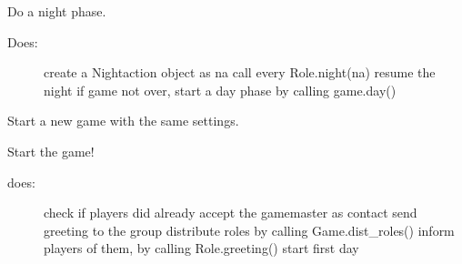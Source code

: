 \documentclass[letterpaper,10pt,english]{sphinxmanual}
\begin{document}
\begin{fulllineitems}
\begin{fulllineitems}
\label{\detokenize{chatwolf:chatwolf.game.Game.night}}
Do a night phase.
\begin{description}
\item[{Does:}] \leavevmode
create a Nightaction object as na
call every Role.night(na)
resume the night
if game not over, start a day phase by calling game.day()

\end{description}

\end{fulllineitems}


\begin{fulllineitems}
\label{\detokenize{chatwolf:chatwolf.game.Game.restart}}
Start a new game with the same settings.

\end{fulllineitems}


\begin{fulllineitems}
\label{\detokenize{chatwolf:chatwolf.game.Game.save_config}}
\end{fulllineitems}


\begin{fulllineitems}
\label{\detokenize{chatwolf:chatwolf.game.Game.start}}
Start the game!
\begin{description}
\item[{does:}] \leavevmode
check if players did already accept the game\sphinxhyphen{}master as contact
send greeting to the group
distribute roles by calling Game.dist\_roles()
inform players of them, by calling Role.greeting()
start first day

\end{description}

\end{fulllineitems}


\end{fulllineitems}
\end{document}
